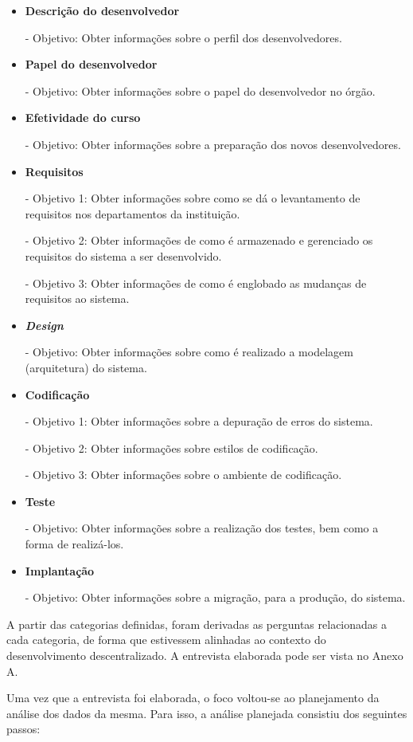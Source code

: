 \begin{itemize}
\item \textbf{Descrição do desenvolvedor} 

- Objetivo: Obter informações sobre o perfil dos desenvolvedores.
\item \textbf{Papel do desenvolvedor}

- Objetivo: Obter informações sobre o papel do desenvolvedor no órgão.
\item \textbf{Efetividade do curso}

- Objetivo: Obter informações sobre a preparação dos novos desenvolvedores.
\item \textbf{Requisitos}

- Objetivo 1: Obter informações sobre como se dá o levantamento de requisitos nos departamentos da instituição.

- Objetivo 2: Obter informações de como é armazenado e gerenciado os requisitos do sistema a ser desenvolvido.

- Objetivo 3: Obter informações de como é englobado as mudanças de requisitos ao sistema.
\item \textbf{\textit{Design}}

- Objetivo: Obter informações sobre como é realizado a modelagem (arquitetura) do sistema.
\item \textbf{Codificação}

- Objetivo 1: Obter informações sobre a depuração de erros do sistema.

- Objetivo 2: Obter informações sobre estilos de codificação.

- Objetivo 3: Obter informações sobre o ambiente de codificação.

\item \textbf{Teste}

- Objetivo: Obter informações sobre a realização dos testes, bem como a forma de realizá-los.
\item \textbf{Implantação}

- Objetivo: Obter informações sobre a migração, para a produção, do sistema.
\end{itemize}

A partir das categorias definidas, foram derivadas as perguntas relacionadas a cada categoria, de forma que estivessem alinhadas ao contexto do desenvolvimento descentralizado. A entrevista elaborada pode ser vista no Anexo A.

Uma vez que a entrevista foi elaborada, o foco voltou-se ao planejamento da análise dos dados da mesma. Para isso, a análise planejada consistiu dos seguintes passos:

